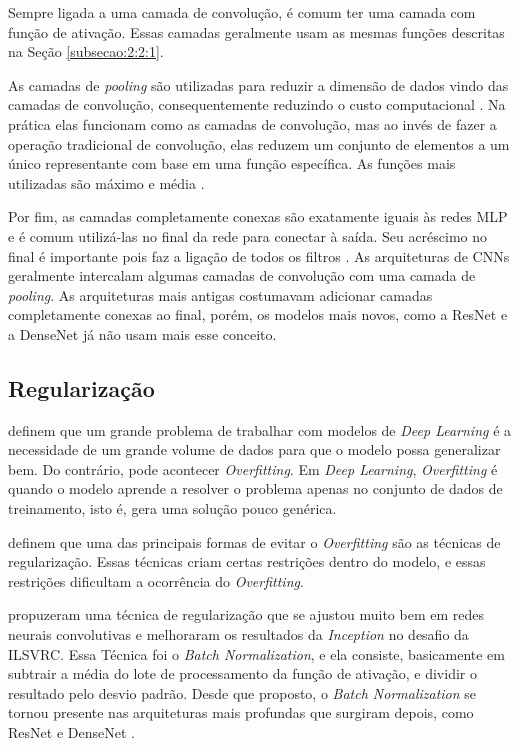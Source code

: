 Sempre ligada a uma camada de convolução, é comum ter uma camada com função de ativação. Essas camadas geralmente usam as mesmas funções descritas na Seção \ref{subsecao:2:2:1}.

As camadas de \textit{pooling} são utilizadas para reduzir a dimensão de dados vindo das camadas de convolução, consequentemente reduzindo o custo computacional \cite{ferreira-2017}. Na prática elas funcionam como as camadas de convolução, mas ao invés de fazer a operação tradicional de convolução, elas reduzem um conjunto de elementos a um único representante com base em uma função específica. As funções mais utilizadas são máximo e média \cite{ferreira-2017}.

Por fim, as camadas completamente conexas são exatamente iguais às redes MLP e é comum utilizá-las no final da rede para conectar à saída. Seu acréscimo no final é importante pois faz a ligação de todos os filtros \cite{ferreira-2017}. As arquiteturas de \ac{CNN}s geralmente intercalam algumas camadas de convolução com uma camada de \textit{pooling}. As arquiteturas mais antigas costumavam adicionar camadas completamente conexas ao final, porém, os modelos mais novos, como a \ac{ResNet} e a \ac{DenseNet} já não usam mais esse conceito.

\subsection{Regularização}
\label{subsecao:2:3:2}

 definem que um grande problema de trabalhar com modelos de \textit{Deep Learning} é a necessidade de um grande volume de dados para que o modelo possa generalizar bem. Do contrário, pode acontecer \textit{Overfitting}. Em \textit{Deep Learning}, \textit{Overfitting} é quando o modelo aprende a resolver o problema apenas no conjunto de dados de treinamento, isto é, gera uma solução pouco genérica.

 definem que uma das principais formas de evitar o \textit{Overfitting} são as técnicas de regularização. Essas técnicas criam certas restrições dentro do modelo, e essas restrições dificultam a ocorrência do \textit{Overfitting}.

 propuzeram uma técnica de regularização que se ajustou muito bem em redes neurais convolutivas e melhoraram os resultados da \textit{Inception} \cite{szegedy-2015} no desafio da \ac{ILSVRC}. Essa Técnica foi o \textit{Batch Normalization}, e ela consiste, basicamente em subtrair a média do lote de processamento da função de ativação, e dividir o resultado pelo desvio padrão. Desde que proposto, o \textit{Batch Normalization} se tornou presente nas arquiteturas mais profundas que surgiram depois, como \ac{ResNet} \cite{he-2016} e \ac{DenseNet} \cite{liu-2017}.

